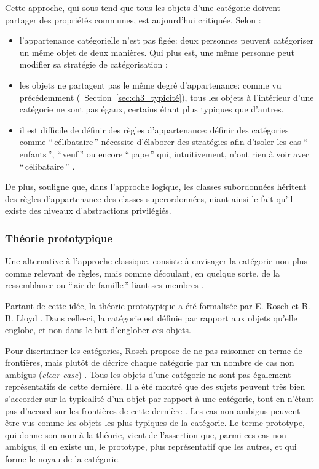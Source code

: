 {Cette approche, qui sous-tend que tous les objets d'une catégorie doivent partager des propriétés communes, est aujourd'hui critiquée. Selon \citep{goldstone2003concepts}:

\begin{itemize}
\item l'appartenance catégorielle n'est pas figée: deux personnes peuvent catégoriser un même objet de deux manières. Qui plus est, une même personne peut modifier sa stratégie de catégorisation \citep{mccloskey1978natural};
\item les objets ne partagent pas le même degré d'appartenance: comme vu précédemment (\cf~Section~\ref{sec:ch3_typicité}), tous les objets à l'intérieur d'une catégorie ne sont pas égaux, certains étant plus typiques que d'autres.
\item il est difficile de définir des règles d'appartenance: définir des catégories comme ``\,célibataire\,'' nécessite d'élaborer des stratégies afin d'isoler les cas ``\,enfants\,'', ``\,veuf\,'' ou encore ``\,pape\,'' qui, intuitivement, n'ont rien à voir avec ``\,célibataire\,'' . 
\end{itemize}

De plus, \citep[49]{Houix03f} souligne que, dans l'approche logique, les classes subordonnées héritent des règles d'appartenance des classes superordonnées, niant ainsi le fait qu'il existe des niveaux d'abstractions privilégiés. 

\subsubsection{Théorie prototypique}

Une alternative à l'approche classique, consiste à envisager la catégorie non plus comme relevant de règles, mais comme découlant, en quelque sorte, de la ressemblance ou ``\,air de famille\,'' liant ses membres \citep{ludwig1953philosophical}.

Partant de cette idée, la théorie prototypique a été formalisée par E. Rosch et B. B. Lloyd \citep{rosch1978cognition}. Dans celle-ci, la catégorie est définie par rapport aux objets qu'elle englobe, et non dans le but d'englober ces objets.

Pour discriminer les catégories, Rosch propose de ne pas raisonner en terme de frontières, mais plutôt de décrire chaque catégorie par un nombre de cas non ambigus (\emph{clear case}) \citep[p. 36]{rosch1978cognition}. Tous les objets d'une catégorie ne sont pas également représentatifs de cette dernière. Il a été montré que des sujets peuvent très bien s'accorder sur la typicalité d'un objet par rapport à une catégorie, tout en n'étant pas d'accord sur les frontières de cette dernière \citep{rosch1974human,rosch1975cognitive}. Les cas non ambigus peuvent être vus comme les objets les plus typiques de la catégorie. Le terme prototype, qui donne son nom à la théorie, vient de l'assertion que, parmi ces cas non ambigus, il en existe un, le prototype, plus représentatif que les autres, et qui forme le noyau de la catégorie.

}
